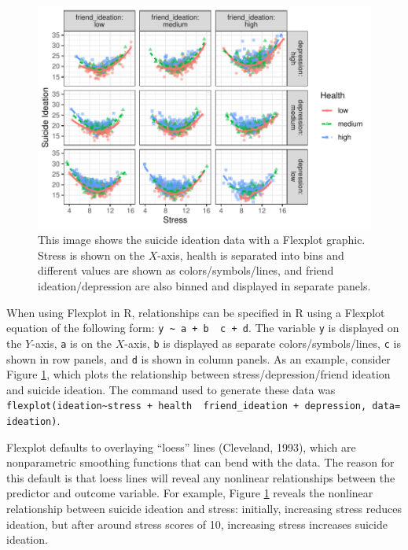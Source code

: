 \documentclass[
  man,floatsintext]{apa6}
\begin{document}
\begin{figure}

{\centering \includegraphics[width=0.75\linewidth]{visual_partitions_files/figure-latex/flexplotequation-1} 

}

\caption{This image shows the suicide ideation data with a Flexplot graphic. Stress is shown on the $X$-axis, health is separated into bins and different values are shown as colors/symbols/lines, and friend ideation/depression are also binned and displayed in separate panels.}\label{fig:flexplotequation}
\end{figure}

When using Flexplot in R, relationships can be specified in R using a Flexplot equation of the following form: \texttt{y\ \textasciitilde{}\ a\ +\ b\ \textbar{}\ c\ +\ d}. The variable \texttt{y} is displayed on the \(Y\)-axis, \texttt{a} is on the \(X\)-axis, \texttt{b} is displayed as separate colors/symbols/lines, \texttt{c} is shown in row panels, and \texttt{d} is shown in column panels. As an example, consider Figure \ref{fig:flexplotequation}, which plots the relationship between stress/depression/friend ideation and suicide ideation. The command used to generate these data was \texttt{flexplot(ideation\textasciitilde{}stress\ +\ health\ \textbar{}\ friend\_ideation\ +\ depression,\ data=ideation)}.

Flexplot defaults to overlaying ``loess'' lines (Cleveland, 1993), which are nonparametric smoothing functions that can bend with the data. The reason for this default is that loess lines will reveal any nonlinear relationships between the predictor and outcome variable. For example, Figure \ref{fig:flexplotequation} reveals the nonlinear relationship between suicide ideation and stress: initially, increasing stress reduces ideation, but after around stress scores of 10, increasing stress increases suicide ideation.
\end{document}
